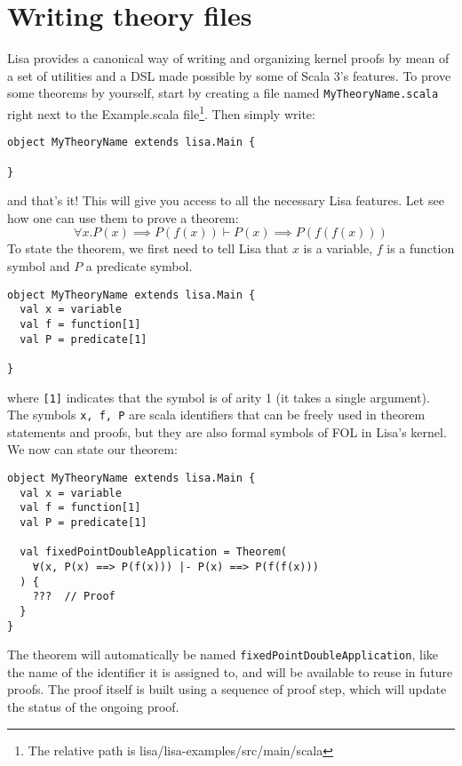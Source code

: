 \section{Writing theory files}
Lisa provides a canonical way of writing and organizing kernel proofs by mean of a set of utilities and a DSL made possible by some of Scala 3's features.
To prove some theorems by yourself, start by creating a file named \lstinline|MyTheoryName.scala| right next to the Example.scala file\footnote{The relative path is lisa/lisa-examples/src/main/scala}.
Then simply write:

\noindent\begin{minipage}{\linewidth}\vspace{1em}
\begin{lstlisting}[language=lisa, frame=single]
object MyTheoryName extends lisa.Main {

}
\end{lstlisting}
\end{minipage}
and that's it! This will give you access to all the necessary Lisa features. Let see how one can use them to prove a theorem:
$$
  \forall x. P(x) \implies P(f(x)) \vdash P(x) \implies P(f(f(x)))
$$
To state the theorem, we first need to tell Lisa that $x$ is a variable, $f$ is a function symbol and $P$ a predicate symbol. 

\noindent\begin{minipage}{\linewidth}\vspace{1em}
\begin{lstlisting}[language=lisa, frame=single]
object MyTheoryName extends lisa.Main {
  val x = variable
  val f = function[1]
  val P = predicate[1]

}
\end{lstlisting}
\end{minipage}

where \lstinline|[1]| indicates that the symbol is of arity 1 (it takes a single argument). The symbols \lstinline|x, f, P| are scala identifiers that can be freely used in theorem statements and proofs, but they are also formal symbols of FOL in Lisa's kernel. 
We now can state our theorem:

\noindent\begin{minipage}{\linewidth}\vspace{1em}
\begin{lstlisting}[language=lisa, frame=single]
object MyTheoryName extends lisa.Main {
  val x = variable
  val f = function[1]
  val P = predicate[1]

  val fixedPointDoubleApplication = Theorem(
    ∀(x, P(x) ==> P(f(x))) |- P(x) ==> P(f(f(x)))
  ) {
    ???  // Proof
  } 
}
\end{lstlisting}
\end{minipage}
The theorem will automatically be named \lstinline|fixedPointDoubleApplication|, like the name of the identifier it is assigned to, and will be available to reuse in future proofs. The proof itself is built using a sequence of proof step, which will update the status of the ongoing proof.

